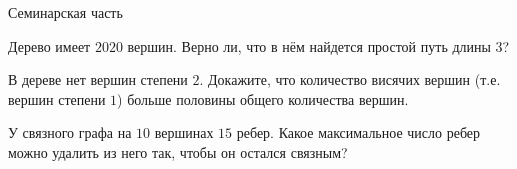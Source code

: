 \begin{frame}{Семинарская часть}

\z Дерево имеет $2020$ вершин. Верно ли, что в нём найдется простой путь
длины $3$?

\z В дереве нет вершин степени $2$. Докажите, что количество висячих
вершин (т.е. вершин степени $1$) больше половины общего количества вершин.

\z У связного графа на $10$ вершинах $15$ ребер. Какое максимальное число ребер можно удалить из него так, чтобы он остался связным?

\end{frame}







